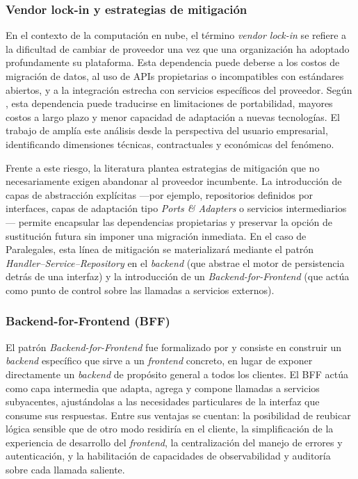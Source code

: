 \subsubsection{Vendor lock-in y estrategias de mitigación}

En el contexto de la computación en nube, el término \textit{vendor lock-in} se refiere a la dificultad de cambiar de proveedor una vez que una organización ha adoptado profundamente su plataforma. Esta dependencia puede deberse a los costos de migración de datos, al uso de APIs propietarias o incompatibles con estándares abiertos, y a la integración estrecha con servicios específicos del proveedor. Según \textcite{OparaMartins2016}, esta dependencia puede traducirse en limitaciones de portabilidad, mayores costos a largo plazo y menor capacidad de adaptación a nuevas tecnologías. El trabajo de \textcite{Harauzek2022} amplía este análisis desde la perspectiva del usuario empresarial, identificando dimensiones técnicas, contractuales y económicas del fenómeno.

Frente a este riesgo, la literatura plantea estrategias de mitigación que no necesariamente exigen abandonar al proveedor incumbente. La introducción de capas de abstracción explícitas —por ejemplo, repositorios definidos por interfaces, capas de adaptación tipo \textit{Ports \& Adapters} o servicios intermediarios— permite encapsular las dependencias propietarias y preservar la opción de sustitución futura sin imponer una migración inmediata. En el caso de Paralegales, esta línea de mitigación se materializará mediante el patrón \textit{Handler--Service--Repository} en el \textit{backend} (que abstrae el motor de persistencia detrás de una interfaz) y la introducción de un \textit{Backend-for-Frontend} (que actúa como punto de control sobre las llamadas a servicios externos).

\subsubsection{Backend-for-Frontend (BFF)}

El patrón \textit{Backend-for-Frontend} fue formalizado por \textcite{NewmanBFF} y consiste en construir un \textit{backend} específico que sirve a un \textit{frontend} concreto, en lugar de exponer directamente un \textit{backend} de propósito general a todos los clientes. El BFF actúa como capa intermedia que adapta, agrega y compone llamadas a servicios subyacentes, ajustándolas a las necesidades particulares de la interfaz que consume sus respuestas. Entre sus ventajas se cuentan: la posibilidad de reubicar lógica sensible que de otro modo residiría en el cliente, la simplificación de la experiencia de desarrollo del \textit{frontend}, la centralización del manejo de errores y autenticación, y la habilitación de capacidades de observabilidad y auditoría sobre cada llamada saliente.

